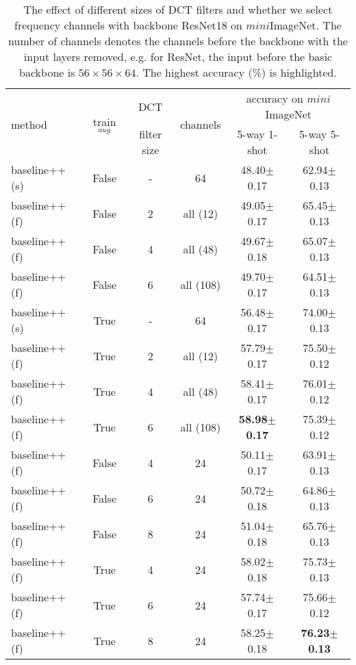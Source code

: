 \documentclass[10pt, conference, compsocconf]{IEEEtran}
\begin{document}
\begin{table*}[ht]
\centering
\caption{The effect of different sizes of DCT filters and whether we select frequency channels with backbone ResNet18 on $\textit{mini}$ImageNet.  The number of channels denotes the channels before the backbone with the input layers removed, e.g. for ResNet, the input before the basic backbone is $56\times 56\times 64$. The highest accuracy (\%) is highlighted.}
\begin{tabular}{l|c|c|c|cc}
\toprule
\multirow{2}{*}{method} &\multirow{2}{*}{train$_{aug}$} & {DCT} & \multirow{2}{*}{channels} & \multicolumn{2}{c}{accuracy on $\textit{mini}$ImageNet} \\
& & filter size & &5-way 1-shot& 5-way 5-shot\\ \hline
baseline++ (s) & False & - & 64 & 48.40$\pm$0.17 & 62.94$\pm$0.13 \\
baseline++ (f) & False & 2 & all (12)& 49.05$\pm$0.17 & 65.45$\pm$0.13 \\
baseline++ (f) & False & 4 & all (48)& 49.67$\pm$0.18 & 65.07$\pm$0.13 \\
baseline++ (f) & False & 6 & all (108)& 49.70$\pm$0.17 & 64.51$\pm$0.13 \\\hline
baseline++ (s) & True & - & 64 & 56.48$\pm$0.17 & 74.00$\pm$0.13 \\

baseline++ (f) & True  & 2 & all (12)& 57.79$\pm$0.17 & 75.50$\pm$0.12 \\
baseline++ (f) & True  & 4 & all (48)& 58.41$\pm$0.17 & 76.01$\pm$0.12 \\
baseline++ (f) & True  & 6 & all (108)& \bf{58.98$\pm$0.17} & 75.39$\pm$0.12 \\\hline\hline

baseline++ (f) & False & 4 & 24 & 50.11$\pm$0.17 & 63.91$\pm$0.13 \\
baseline++ (f) & False & 6 & 24& 50.72$\pm$0.18 & 64.86$\pm$0.13 \\
baseline++ (f) & False & 8 & 24& 51.04$\pm$0.18 & 65.76$\pm$0.13 \\\hline



baseline++ (f) & True  & 4 & 24 & 58.02$\pm$0.18 & 75.73$\pm$0.13 \\
baseline++ (f) & True  & 6 & 24& 57.74$\pm$0.17 &75.66$\pm$0.12 \\
baseline++ (f) & True  & 8 & 24& 58.25$\pm$0.18 & \bf{76.23$\pm$0.13} \\
\bottomrule
\end{tabular}
\label{table3}
\end{table*}
\end{document}
